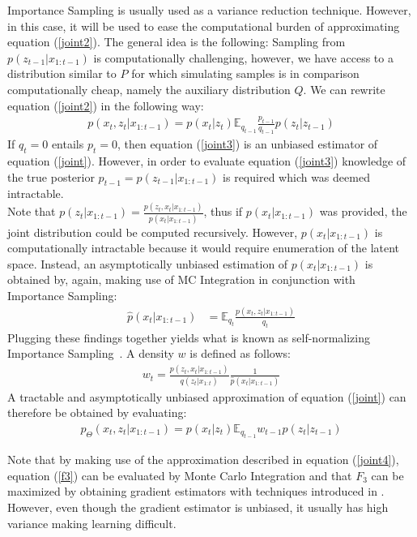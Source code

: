 Importance Sampling is usually used as a variance reduction technique. However, in this case, it will be used to ease the computational burden of approximating equation (\ref{joint2}). The general idea is the following: Sampling from $p(z_{t-1} | x_{1:t-1})$ is computationally challenging, however, we have access to a distribution similar to $P$ for which simulating samples is in comparison computationally cheap, namely the auxiliary distribution $Q$. We can rewrite equation (\ref{joint2}) in the following way:
\begin{align}
p(x_t,z_t|x_{1:t-1}) = p(x_t|z_t) \mathbb E_{q_{t-1}} \frac{p_{t-1}}{q_{t-1}} p(z_t|z_{t-1})  \label{joint3}
\end{align}
If $q_t = 0$ entails $p_t = 0$, then equation (\ref{joint3}) is an unbiased estimator of equation (\ref{joint}). However, in order to evaluate equation (\ref{joint3}) knowledge of the true posterior $p_{t-1} = p(z_{t-1} | x_{1:t-1})$ is required which was deemed intractable.\\
Note that $p(z_t | x_{1:t-1}) = \frac{p(z_t, x_t | x_{1:t-1})}{p(x_t | x_{1:t-1})}$, thus if $p(x_t | x_{1:t-1})$ was provided, the joint distribution could be computed recursively. However, $p(x_t | x_{1:t-1})$ is computationally intractable because it would require enumeration of the latent space. Instead, an asymptotically unbiased estimation of $p(x_t | x_{1:t-1})$ is obtained by, again, making use of MC Integration in conjunction with Importance Sampling:
\begin{align*}
\hat{p}(x_t | x_{1:t-1}) &= \mathbb E_{q_{t}} \frac{p(x_t, z_t | x_{1:t-1})}{q_t}
\end{align*}
Plugging these findings together yields what is known as self-normalizing Importance Sampling~\cite{mcbook}. A density $w$ is defined as follows:
\begin{align}
w_t = \frac{p(z_t, x_t | x_{1:t-1})}{ q(z_t | x_{1:t})} \frac{1}{\hat{p}(x_t | x_{1:t-1})} \label{W}
\end{align}
A tractable and asymptotically unbiased approximation of equation (\ref{joint}) can therefore be obtained by evaluating:
\begin{align}
p_\Theta(x_t,z_t|x_{1:t-1}) = p(x_t|z_t) \mathbb E_{q_{t-1}} w_{t-1} p(z_t|z_{t-1})  \label{joint4}
\end{align}

Note that by making use of the approximation described in equation (\ref{joint4}), equation (\ref{f3}) can be evaluated by Monte Carlo Integration and that $F_3$ can be maximized by obtaining gradient estimators with techniques introduced in \cite{ranganath2014black}. However, even though the gradient estimator is unbiased, it usually has high variance making learning difficult.

